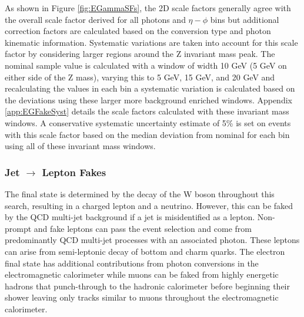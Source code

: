 As shown in Figure \ref{fig:EGammaSFs}, the 2D scale factors generally agree with the overall scale factor derived for all photons and $\eta - \phi$ bins but additional correction factors are calculated based on the conversion type and photon kinematic information.  Systematic variations are taken into account for this scale factor by considering larger regions around the Z invariant mass peak.  The nominal sample value is calculated with a window of width 10 GeV (5 GeV on either side of the Z mass), varying this to 5 GeV, 15 GeV, and 20 GeV and recalculating the values in each bin a systematic variation is calculated based on the deviations using these larger more background enriched windows.  Appendix \ref{app:EGFakeSyst} details the scale factors calculated with these invariant mass windows.  A conservative systematic uncertainty estimate of 5\% is set on events with this scale factor based on the median deviation from nominal for each bin using all of these invariant mass windows.  




\subsubsection{Jet $\rightarrow$ Lepton Fakes}
\label{sec:FakeLep}
The final state is determined by the decay of the W boson throughout this search, resulting in a charged lepton and a neutrino.  However, this can be faked by the QCD multi-jet background if a jet is misidentified as a lepton.  Non-prompt and fake leptons can pass the event selection and come from predominantly QCD multi-jet processes with an associated photon.  These leptons can arise from semi-leptonic decay of bottom and charm quarks.  The electron final state has additional contributions from photon conversions in the electromagnetic calorimeter while muons can be faked from highly energetic hadrons that punch-through to the hadronic calorimeter before beginning their shower leaving only tracks similar to muons throughout the electromagnetic calorimeter.  

